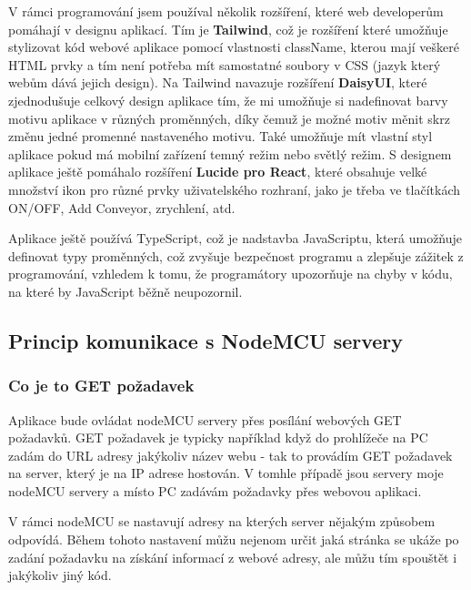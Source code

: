 V rámci programování jsem používal několik rozšíření, které web developerům pomáhají v designu aplikací. Tím je \textbf{Tailwind}, což je rozšíření které umožňuje stylizovat kód webové aplikace pomocí vlastnosti className, kterou mají veškeré HTML prvky a tím není potřeba mít samostatné soubory v CSS (jazyk který webům dává jejich design). Na Tailwind navazuje rozšíření \textbf{DaisyUI}, které zjednodušuje celkový design aplikace tím, že mi umožňuje si nadefinovat barvy motivu aplikace v různých proměnných, díky čemuž je možné motiv měnit skrz změnu jedné promenné nastaveného motivu. Také umožňuje mít vlastní styl aplikace pokud má mobilní zařízení temný režim nebo světlý režim. S designem aplikace ještě pomáhalo rozšíření \textbf{Lucide pro React}, které obsahuje velké množství ikon pro různé prvky uživatelského rozhraní, jako je třeba ve tlačítkách ON/OFF, Add Conveyor, zrychlení, atd.

Aplikace ještě používá TypeScript, což je nadstavba JavaScriptu, která umožňuje definovat typy proměnných, což zvyšuje bezpečnost programu a zlepšuje zážitek z programování, vzhledem k tomu, že programátory upozorňuje na chyby v kódu, na které by JavaScript běžně neupozornil.

\subsection{Princip komunikace s NodeMCU servery}


\subsubsection{Co je to GET požadavek }

Aplikace bude ovládat nodeMCU servery přes posílání webových GET požadavků. GET požadavek je typicky například když do prohlížeče na PC zadám do URL adresy jakýkoliv název webu - tak to provádím GET požadavek na server, který je na IP adrese hostován. V tomhle případě jsou servery moje nodeMCU servery a místo PC zadávám požadavky přes webovou aplikaci.

V rámci nodeMCU se nastavují adresy na kterých server nějakým způsobem odpovídá. Během tohoto nastavení můžu nejenom určit jaká stránka se ukáže po zadání požadavku na získání informací z webové adresy, ale můžu tím spouštět i jakýkoliv jiný kód.

